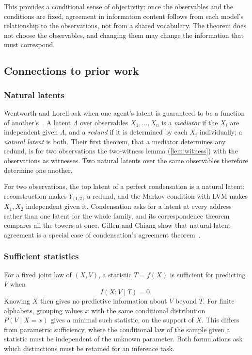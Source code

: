 \documentclass[11pt]{article}
\begin{document}
This provides a conditional sense of objectivity: once the observables and the
conditions are fixed, agreement in information content follows from each
model's relationship to the observations, not from a shared vocabulary. The
theorem does not choose the observables, and changing them may change the
information that must correspond.

\subsection{Connections to prior work}
\label{sec:context-connections}
\subsubsection{Natural latents}
Wentworth and Lorell ask when one agent's latent is guaranteed to be a
function of another's~\citep{wentworth2025natural}. A latent $\Lambda$ over
observables $X_1,\ldots,X_n$ is a \emph{mediator} if the $X_i$ are independent
given $\Lambda$, and a \emph{redund} if it is determined by each $X_i$
individually; a \emph{natural latent} is both. Their first theorem, that a
mediator determines any redund, is for two observations the two-witness lemma
(\cref{lem:witness}) with the observations as witnesses. Two natural latents
over the same observables therefore determine one another.

For two observations, the top latent of a perfect condensation is a natural
latent: reconstruction makes $Y_{\{1,2\}}$ a redund, and the Markov condition
with LVM makes $X_1,X_2$ independent given it. Condensation asks for a latent
at every address rather than one latent for the whole family, and its
correspondence theorem compares all the towers at once. Gillen and Chiang show
that natural-latent agreement is a special case of condensation's agreement
theorem~\citep{gillen2026summary}.

\subsubsection{Sufficient statistics}
For a fixed joint law of $(X,V)$, a statistic $T=f(X)$ is sufficient for predicting
$V$ when
\[
 I(X;V\mid T)=0.
\]
Knowing $X$ then gives no predictive information about $V$ beyond $T$.
For finite alphabets, grouping values $x$ with the same conditional distribution
$P(V\mid X=x)$ gives a minimal such statistic, on the support of $X$.
This differs from parametric sufficiency, where the conditional law of
the sample given a statistic must be independent of the unknown parameter.
Both formulations ask which distinctions must be retained for an inference task.
\end{document}
